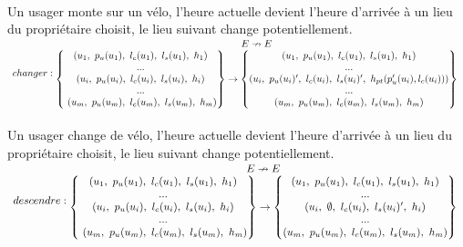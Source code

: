 \documentclass[french]{article}
\begin{document}
\\
Un usager monte sur un vélo, l'heure actuelle devient l'heure d'arrivée à un lieu du propriétaire choisit, le lieu suivant change potentiellement.
\vspace*{0.5cm}
\\
$\displaystyle  \begin{array}{{>{\displaystyle}l}}
changer:
\begin{matrix}
E\nrightarrow E\\
\begin{Bmatrix}
( u_{1} ,\ p_{u}( u_{1}) ,\ l_{c}( u_{1}) ,\ l_{s}( u_{1}) ,\ h_{1})\\
...\\
( u_{i} ,\ p_{u}( u_{i}) ,\ l_{c}( u_{i}) ,\ l_{s}( u_{i}) ,\ h_{i})\\
...\\
\ ( u_{m} ,\ p_{u}( u_{m}) ,\ l_{c}( u_{m}) ,\ l_{s}( u_{m}) ,\ h_{m})
\end{Bmatrix}\rightarrow \begin{Bmatrix}
( u_{1} ,\ p_{u}( u_{1}) ,\ l_{c}( u_{1}) ,\ l_{s}( u_{1}) ,\ h_{1})\\
...\\
( u_{i} ,\ p_{u}( u_{i}) ',\ l_{c}( u_{i}) ,\ l_{s}( u_{i}) ',\ h_{pt}( p_{u} '( u_{i}) ,l_{c}( u_{i})))\\
...\\
( u_{m} ,\ p_{u}( u_{m}) ,\ l_{c}( u_{m}) ,\ l_{s}( u_{m}) ,\ h_{m})
\end{Bmatrix}
\end{matrix} \ 
\end{array}$\\
\\
Un usager change de vélo, l'heure actuelle devient l'heure d'arrivée à un lieu du propriétaire choisit, le lieu suivant change potentiellement.
\vspace*{0.5cm}
\\
$\displaystyle  \begin{array}{{>{\displaystyle}l}}
descendre:
\begin{matrix}
E\nrightarrow E\\
\begin{Bmatrix}
( u_{1} ,\ p_{u}( u_{1}) ,\ l_{c}( u_{1}) ,\ l_{s}( u_{1}) ,\ h_{1})\\
...\\
( u_{i} ,\ p_{u}( u_{i}) ,\ l_{c}( u_{i}) ,\ l_{s}( u_{i}) ,\ h_{i})\\
...\\
\ ( u_{m} ,\ p_{u}( u_{m}) ,\ l_{c}( u_{m}) ,\ l_{s}( u_{m}) ,\ h_{m})
\end{Bmatrix}\rightarrow \begin{Bmatrix}
( u_{1} ,\ p_{u}( u_{1}) ,\ l_{c}( u_{1}) ,\ l_{s}( u_{1}) ,\ h_{1})\\
...\\
( u_{i} ,\ \emptyset ,\ l_{c}( u_{i}) ,\ l_{s}( u_{i}) ',\ h_{i})\\
...\\
( u_{m} ,\ p_{u}( u_{m}) ,\ l_{c}( u_{m}) ,\ l_{s}( u_{m}) ,\ h_{m})
\end{Bmatrix}
\end{matrix} \ 
\end{array}$\\
\end{document}
